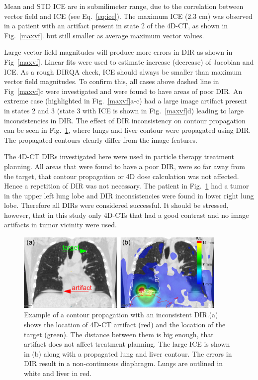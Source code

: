 \documentclass[type=dr, dr=rernat, accentcolor=tud7b,colorbacktitle, bigchapter, openright, twoside, 12pt ]{tudthesis}
\begin{document}
Mean and STD ICE are in submilimeter range, due to the correlation between vector field and ICE (see Eq.~\ref{eq:ice}). The maximum ICE (2.3 cm) was observed in a patient with 
an artifact present in state 2 of the 4D-CT, as shown in Fig.~\ref{maxvf}.
but still smaller as average maximum vector values. 

Large vector field magnitudes will produce more errors in DIR as shown in Fig~\ref{maxvf}. Linear fits were used to estimate increase (decrease) of Jacobian and ICE. 
As a rough DIRQA check, ICE should always be smaller than maximum vector field magnitudes. To confirm this, all cases above dashed line in Fig~\ref{maxvf}c 
were investigated and were found to have areas of poor DIR. An extreme case (highlighted in Fig.~\ref{maxvf}a-c)
had a large image artifact present in states 2 and 3 (state 3 with ICE is shown in Fig.~\ref{maxvf}d) leading to large inconsistencies in DIR. 
The effect of DIR inconsistency on contour propagation can be seen in Fig.~\ref{contourPropagation},
where lungs and liver contour were propagated using DIR. The propagated contours clearly differ from the image features.

The 4D-CT DIRs investigated here were used in particle therapy treatment planning. All areas that were found to have a poor DIR, were so far away from the target, that contour propagation or 4D dose calculation was not affected.
Hence a repetition of DIR was not necessary.
The patient in Fig.~\ref{contourPropagation} had a tumor in the upper left lung lobe and DIR inconsistencies were found in lower right lung lobe. 
Therefore all DIRs were considered successful. It should be stressed, however, that in this study only 4D-CTs that had a good contrast and no image artifacts in tumor vicinity were used.

\begin{figure}[H]
	\begin{center}		
		\includegraphics[width=0.9\textwidth]{./Images/ContourPropagation/contourPropagation.png}
		\caption{Example of a contour propagation with an inconsistent DIR.(a) shows the location of 4D-CT artifact (red) and the location of the target (green). 
		The distance between them is big enough, that artifact does not affect treatment planning. 
		The large ICE is shown in (b) along with a propagated lung and liver contour. The errors in DIR result in a non-continuous diaphragm. Lungs are outlined in white and liver in red.}
		\label{contourPropagation}
	\end{center}
\end{figure}
\end{document}
